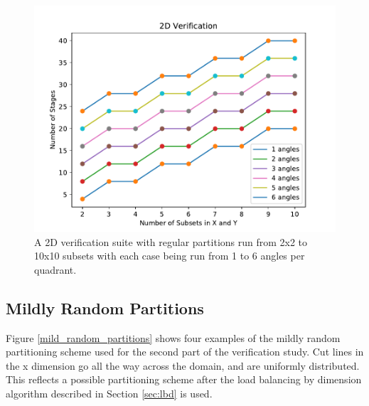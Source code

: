 \begin{figure}[H]
\centering
\includegraphics[scale=0.8]{../figures/regular_verification.pdf}
\caption{A 2D verification suite with regular partitions run from 2x2 to 10x10 subsets with each case being run from 1 to 6 angles per quadrant.}
\label{regular_verification}
\end{figure}

\subsection{Mildly Random Partitions}
Figure \ref{mild_random_partitions} shows four examples of the mildly random partitioning scheme used for the second part of the verification study. Cut lines in the x dimension go all the way across the domain, and are uniformly distributed. This reflects a possible partitioning scheme after the load balancing by dimension algorithm described in Section \ref{sec:lbd} is used.

